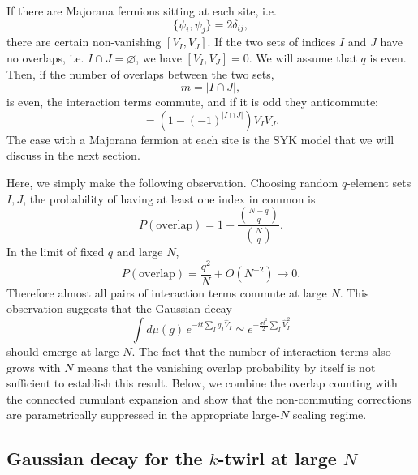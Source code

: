 \documentclass{article}
\theoremstyle{definition}
\begin{document}
If there are Majorana fermions sitting at each site, i.e.
\begin{equation}
    \{\psi_i,\psi_j\}=2\delta_{ij},
\end{equation}
there are certain non-vanishing $[V_I,V_J]$. If the two sets of indices
$I$ and $J$ have no overlaps, i.e. $I\cap J=\varnothing$, we have
$[V_I,V_J]=0$. We will assume that $q$ is even. Then, if the number of
overlaps between the two sets,
\begin{equation}
    m=|I\cap J|,
\end{equation}
is even, the interaction terms commute, and if it is odd they anticommute:
\begin{equation}
    [V_I,V_J]
    =
    \left(1-(-1)^{|I\cap J|}\right)V_IV_J.
    \label{eq:majorana_overlap_commutator}
\end{equation}
The case with a Majorana fermion at each site is the SYK model that we will
discuss in the next section.

Here, we simply make the following observation. Choosing random $q$-element
sets $I,J$, the probability of having at least one index in common is
\begin{equation}
    P(\mathrm{overlap})
    =
    1-
    \frac{\binom{N-q}{q}}{\binom Nq}.
    \label{eq:overlap_probability}
\end{equation}
In the limit of fixed $q$ and large $N$,
\begin{equation}
    P(\mathrm{overlap})
    =
    \frac{q^2}{N}
    +
    O(N^{-2})
    \longrightarrow0.
    \label{eq:overlap_largeN}
\end{equation}
Therefore almost all pairs of interaction terms commute at large $N$.
This observation suggests that the Gaussian decay
\begin{equation}
    \int d\mu(g)\,
    e^{-it\sum_I g_I\widehat V_I}
    \simeq
    e^{-\frac{\sigma t^2}{2}
    \sum_I\widehat V_I^2}
    \label{eq:largeN_gaussian_schematic}
\end{equation}
should emerge at large $N$.  The fact that the number of interaction terms
also grows with $N$ means that the vanishing overlap probability by itself
is not sufficient to establish this result. Below, we combine the overlap
counting with the connected cumulant expansion and show that the
non-commuting corrections are parametrically suppressed in the appropriate
large-$N$ scaling regime.


\subsection{Gaussian decay for the $k$-twirl at large $N$}
\label{subsec:quenched_syk_gaussian_regulator}
\end{document}
